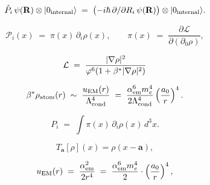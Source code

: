 \begin{equation}
  \hat{P}_i\,\psi(\mathbf{R})\otimes|0_{\rm internal}\rangle
  \;=\; \bigl(-i\hbar\,\partial/\partial R_i\,\psi(\mathbf{R})\bigr)
        \otimes|0_{\rm internal}\rangle.
  \label{P13:eq:momentum_on_sector_dup}
\end{equation}

\begin{equation}
  \mathcal{P}_i(x)
  \;=\; \pi(x)\,\partial_i\rho(x),
  \qquad
  \pi(x) \;=\; \frac{\partial\mathcal{L}}{\partial(\partial_0\rho)},
  \label{P13:eq:noether_momentum}
\end{equation}

\begin{equation}
  \mathcal{L} \;=\; \frac{|\nabla\rho|^2}{\varphi^6(1+\beta^{*}|\nabla\rho|^2)}
  \label{P13:eq:parent_L}
\end{equation}

\begin{equation}
  \beta^{*}\rho_{\rm atom}(r)
  \;\sim\;
  \frac{u_{\rm EM}(r)}{\Lambda_{\mathrm{cond}}^4}
  \;=\; \frac{\alpha_{\mathrm{em}}^6 m_e^4}{2\Lambda_{\mathrm{cond}}^4}
        \left(\frac{a_0}{r}\right)^4.
  \label{P13:eq:rho_atom}
\end{equation}

\begin{equation}
  P_i \;=\; \int \pi(x)\,\partial_i\rho(x)\,d^3x.
  \label{P13:eq:total_momentum}
\end{equation}

\begin{equation}
  T_{\mathbf{a}}[\rho](x) = \rho(x-\mathbf{a}),
  \label{P13:eq:translation_action}
\end{equation}

\begin{equation}
  u_{\rm EM}(r)
  \;=\; \frac{\alpha_{\mathrm{em}}^2}{2r^4}
  \;=\; \frac{\alpha_{\mathrm{em}}^6 m_e^4}{2}\cdot\left(\frac{a_0}{r}\right)^4,
  \label{P13:eq:uEM}
\end{equation}
